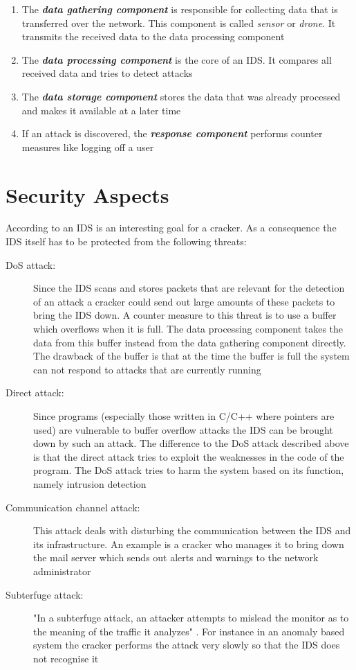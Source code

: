 \begin{enumerate}
    \item The {\bf {\em data gathering component}} is responsible for collecting data that is transferred over the network. This component is called {\em sensor} or {\em drone}. It transmits the received data to the data processing component
	\item The {\bf {\em data processing component}} is the core of an IDS. It compares all received data and tries to detect attacks
	\item The {\bf {\em data storage component}} stores the data that was already processed and makes it available at a later time
	\item If an attack is discovered, the {\bf {\em response component}} performs counter measures like logging off a user
\end{enumerate}

\section{Security Aspects}

According to \cite{wids_schreiber} an IDS is an interesting goal for a cracker. As a consequence the IDS itself has to be protected from the following threats:

\begin{description}
    \item[DoS attack:] Since the IDS scans and stores packets that are relevant for the detection of an attack a cracker could send out large amounts of these packets to bring the IDS down. A counter measure to this threat is to use a buffer which overflows when it is full. The data processing component takes the data from this buffer instead from the data gathering component directly. The drawback of the buffer is that at the time the buffer is full the system can not respond to attacks that are currently running
    \item[Direct attack:] Since programs (especially those written in C/C++ 
where pointers are used) are vulnerable to buffer overflow attacks the IDS can be brought down by such an attack. The difference to the DoS attack described above is that the direct attack tries to exploit the weaknesses in the code of the program. The DoS attack tries to harm the system based on its function, namely intrusion detection
	\item[Communication channel attack:] This attack deals with disturbing the communication between the IDS and its infrastructure. An example is a cracker who manages it to bring down the mail server which sends out alerts and warnings to the network administrator
	\item[Subterfuge attack:] "In a subterfuge attack, an attacker attempts to mislead the monitor as to the meaning of the traffic it analyzes" \cite{subterfuge_attack}. For instance in an anomaly based system the cracker performs the attack very slowly so that the IDS does not recognise it

\end{description}


